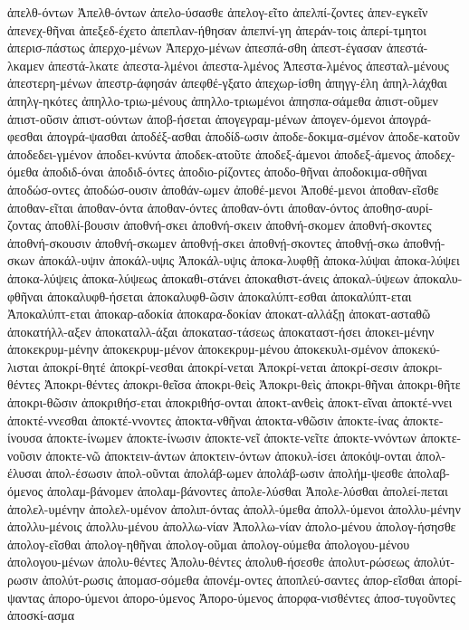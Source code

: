 {ἀπελθ-όντων
Ἀπελθ-όντων
ἀπελο-ύσασθε
ἀπελογ-εῖτο
ἀπελπί-ζοντες
ἀπεν-εγκεῖν
ἀπενεχ-θῆναι
ἀπεξεδ-έχετο
ἀπεπλαν-ήθησαν
ἀπεπνί-γη
ἀπεράν-τοις
ἀπερί-τμητοι
ἀπερισ-πάστως
ἀπερχο-μένων
Ἀπερχο-μένων
ἀπεσπά-σθη
ἀπεστ-έγασαν
ἀπεστά-λκαμεν
ἀπεστά-λκατε
ἀπεστα-λμένοι
ἀπεστα-λμένος
Ἀπεστα-λμένος
ἀπεσταλ-μένους
ἀπεστερη-μένων
ἀπεστρ-άφησάν
ἀπεφθέ-γξατο
ἀπεχωρ-ίσθη
ἀπηγγ-έλη
ἀπηλ-λάχθαι
ἀπηλγ-ηκότες
ἀπηλλο-τριω-μένους
ἀπηλλο-τριωμένοι
ἀπησπα-σάμεθα
ἀπιστ-οῦμεν
ἀπιστ-οῦσιν
ἀπιστ-ούντων
ἀποβ-ήσεται
ἀπογεγραμ-μένων
ἀπογεν-όμενοι
ἀπογρά-φεσθαι
ἀπογρά-ψασθαι
ἀποδέξ-ασθαι
ἀποδίδ-ωσιν
ἀποδε-δοκιμα-σμένον
ἀποδε-κατοῦν
ἀποδεδει-γμένον
ἀποδει-κνύντα
ἀποδεκ-ατοῦτε
ἀποδεξ-άμενοι
ἀποδεξ-άμενος
ἀποδεχ-όμεθα
ἀποδιδ-όναι
ἀποδιδ-όντες
ἀποδιο-ρίζοντες
ἀποδο-θῆναι
ἀποδοκιμα-σθῆναι
ἀποδώσ-οντες
ἀποδώσ-ουσιν
ἀποθάν-ωμεν
ἀποθέ-μενοι
Ἀποθέ-μενοι
ἀποθαν-εῖσθε
ἀποθαν-εῖται
ἀποθαν-όντα
ἀποθαν-όντες
ἀποθαν-όντι
ἀποθαν-όντος
ἀποθησ-αυρί-ζοντας
ἀποθλί-βουσιν
ἀποθνή-σκει
ἀποθνή-σκειν
ἀποθνή-σκομεν
ἀποθνή-σκοντες
ἀποθνή-σκουσιν
ἀποθνή-σκωμεν
ἀποθνῄ-σκει
ἀποθνῄ-σκοντες
ἀποθνῄ-σκω
ἀποθνῄ-σκων
ἀποκάλ-υψιν
ἀποκάλ-υψις
Ἀποκάλ-υψις
ἀποκα-λυφθῇ
ἀποκα-λύψαι
ἀποκα-λύψει
ἀποκα-λύψεις
ἀποκα-λύψεως
ἀποκαθι-στάνει
ἀποκαθιστ-άνεις
ἀποκαλ-ύψεων
ἀποκαλυ-φθῆναι
ἀποκαλυφθ-ήσεται
ἀποκαλυφθ-ῶσιν
ἀποκαλύπτ-εσθαι
ἀποκαλύπτ-εται
Ἀποκαλύπτ-εται
ἀποκαρ-αδοκία
ἀποκαρα-δοκίαν
ἀποκατ-αλλάξῃ
ἀποκατ-ασταθῶ
ἀποκατήλλ-αξεν
ἀποκαταλλ-άξαι
ἀποκατασ-τάσεως
ἀποκαταστ-ήσει
ἀποκει-μένην
ἀποκεκρυμ-μένην
ἀποκεκρυμ-μένον
ἀποκεκρυμ-μένου
ἀποκεκυλι-σμένον
ἀποκεκύ-λισται
ἀποκρί-θητέ
ἀποκρί-νεσθαι
ἀποκρί-νεται
Ἀποκρί-νεται
ἀποκρί-σεσιν
ἀποκρι-θέντες
Ἀποκρι-θέντες
ἀποκρι-θεῖσα
ἀποκρι-θεὶς
Ἀποκρι-θεὶς
ἀποκρι-θῆναι
ἀποκρι-θῆτε
ἀποκρι-θῶσιν
ἀποκριθήσ-εται
ἀποκριθήσ-ονται
ἀποκτ-ανθεὶς
ἀποκτ-εῖναι
ἀποκτέ-ννει
ἀποκτέ-ννεσθαι
ἀποκτέ-ννοντες
ἀποκτα-νθῆναι
ἀποκτα-νθῶσιν
ἀποκτε-ίνας
ἀποκτε-ίνουσα
ἀποκτε-ίνωμεν
ἀποκτε-ίνωσιν
ἀποκτε-νεῖ
ἀποκτε-νεῖτε
ἀποκτε-ννόντων
ἀποκτε-νοῦσιν
ἀποκτε-νῶ
ἀποκτειν-άντων
ἀποκτειν-όντων
ἀποκυλ-ίσει
ἀποκόψ-ονται
ἀπολ-έλυσαι
ἀπολ-έσωσιν
ἀπολ-οῦνται
ἀπολάβ-ωμεν
ἀπολάβ-ωσιν
ἀπολήμ-ψεσθε
ἀπολαβ-όμενος
ἀπολαμ-βάνομεν
ἀπολαμ-βάνοντες
ἀπολε-λύσθαι
Ἀπολε-λύσθαι
ἀπολεί-πεται
ἀπολελ-υμένην
ἀπολελ-υμένον
ἀπολιπ-όντας
ἀπολλ-ύμεθα
ἀπολλ-ύμενοι
ἀπολλυ-μένην
ἀπολλυ-μένοις
ἀπολλυ-μένου
ἀπολλω-νίαν
Ἀπολλω-νίαν
ἀπολο-μένου
ἀπολογ-ήσησθε
ἀπολογ-εῖσθαι
ἀπολογ-ηθῆναι
ἀπολογ-οῦμαι
ἀπολογ-ούμεθα
ἀπολογου-μένου
ἀπολογου-μένων
ἀπολυ-θέντες
Ἀπολυ-θέντες
ἀπολυθ-ήσεσθε
ἀπολυτ-ρώσεως
ἀπολύτ-ρωσιν
ἀπολύτ-ρωσις
ἀπομασ-σόμεθα
ἀπονέμ-οντες
ἀποπλεύ-σαντες
ἀπορ-εῖσθαι
ἀπορί-ψαντας
ἀπορο-ύμενοι
ἀπορο-ύμενος
Ἀπορο-ύμενος
ἀπορφα-νισθέντες
ἀποσ-τυγοῦντες
ἀποσκί-ασμα
}
